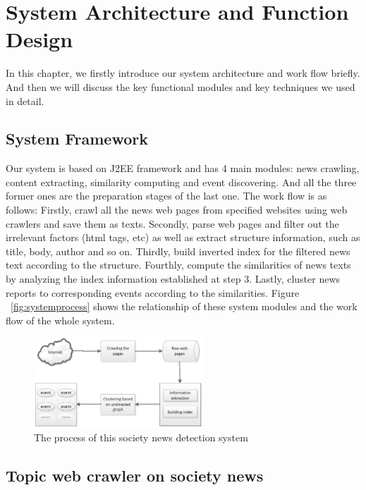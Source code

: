 \documentclass[conference]{IEEEtran}
\begin{document}
\section{System Architecture and Function Design}
In this chapter, we firstly introduce our system architecture and work flow briefly. And then we will discuss the key functional modules and key techniques we used in detail.
\subsection{System Framework}
Our system is based on J2EE framework and has 4 main modules: news crawling, content extracting, similarity computing and event discovering. And all the three former ones are the preparation stages of the last one. The work flow is as follows: Firstly, crawl all the news web pages from specified websites using web crawlers and save them as texts. Secondly, parse web pages and filter out the irrelevant factors (html tags, etc) as well as extract structure information, such as title, body, author and so on. Thirdly, build inverted index for the filtered news text according to the structure. Fourthly, compute the similarities of news texts by analyzing the index information established at step 3. Lastly, cluster news reports to corresponding events according to the similarities. Figure ~\ref{fig:systemprocess} shows the relationship of these system modules and the work flow of the whole system.

\begin{figure}
\centering
\includegraphics[width=2.5in]{process}
\caption{The process of this society news detection system}
\label{systemprocess}
\end{figure}

\subsection{Topic web crawler on society news}
\end{document}
